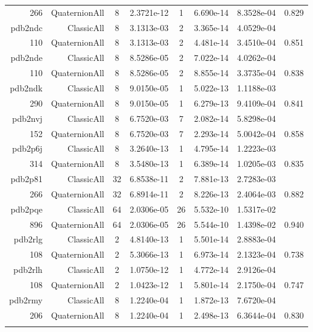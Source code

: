 \begin{xltabular}{\textwidth}{r|rcS[table-format=1.4e+2]cS[table-format=1.3e+2]S[table-format=1.4e+2]S[table-format=-1.3]}
266 & QuaternionAll & 8 & 2.3721e-12 & 1 & 6.690e-14 & 8.3528e-04 & 0.829\\  \addlinespace
pdb2ndc & ClassicAll & 8 & 3.1313e-03 & 2 & 3.365e-14 & 4.0529e-04 & \\
110 & QuaternionAll & 8 & 3.1313e-03 & 2 & 4.481e-14 & 3.4510e-04 & 0.851\\  \addlinespace
pdb2nde & ClassicAll & 8 & 8.5286e-05 & 2 & 7.022e-14 & 4.0262e-04 & \\
110 & QuaternionAll & 8 & 8.5286e-05 & 2 & 8.855e-14 & 3.3735e-04 & 0.838\\  \addlinespace
pdb2ndk & ClassicAll & 8 & 9.0150e-05 & 1 & 5.022e-13 & 1.1188e-03 & \\
290 & QuaternionAll & 8 & 9.0150e-05 & 1 & 6.279e-13 & 9.4109e-04 & 0.841\\  \addlinespace
pdb2nvj & ClassicAll & 8 & 6.7520e-03 & 7 & 2.082e-14 & 5.8298e-04 & \\
152 & QuaternionAll & 8 & 6.7520e-03 & 7 & 2.293e-14 & 5.0042e-04 & 0.858\\  \addlinespace
pdb2p6j & ClassicAll & 8 & 3.2640e-13 & 1 & 4.795e-14 & 1.2223e-03 & \\
314 & QuaternionAll & 8 & 3.5480e-13 & 1 & 6.389e-14 & 1.0205e-03 & 0.835\\  \addlinespace
pdb2p81 & ClassicAll & 32 & 6.8538e-11 & 2 & 7.881e-13 & 2.7283e-03 & \\
266 & QuaternionAll & 32 & 6.8914e-11 & 2 & 8.226e-13 & 2.4064e-03 & 0.882\\  \addlinespace
pdb2pqe & ClassicAll & 64 & 2.0306e-05 & 26 & 5.532e-10 & 1.5317e-02 & \\
896 & QuaternionAll & 64 & 2.0306e-05 & 26 & 5.544e-10 & 1.4398e-02 & 0.940\\  \addlinespace
pdb2rlg & ClassicAll & 2 & 4.8140e-13 & 1 & 5.501e-14 & 2.8883e-04 & \\
108 & QuaternionAll & 2 & 5.3066e-13 & 1 & 6.973e-14 & 2.1323e-04 & 0.738\\  \addlinespace
pdb2rlh & ClassicAll & 2 & 1.0750e-12 & 1 & 4.772e-14 & 2.9126e-04 & \\
108 & QuaternionAll & 2 & 1.0423e-12 & 1 & 5.801e-14 & 2.1750e-04 & 0.747\\  \addlinespace
pdb2rmy & ClassicAll & 8 & 1.2240e-04 & 1 & 1.872e-13 & 7.6720e-04 & \\
206 & QuaternionAll & 8 & 1.2240e-04 & 1 & 2.498e-13 & 6.3644e-04 & 0.830\\  \addlinespace

\end{xltabular}
